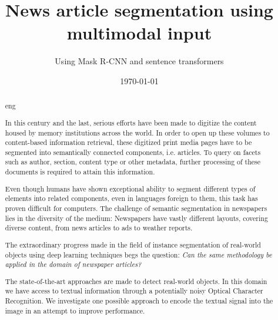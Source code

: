 \documentclass[english, bibtex]{kththesis}
\title{News article segmentation using multimodal input}
\subtitle{Using Mask R-CNN and sentence transformers}
\date{\today}
\begin{document}
%

\titlepage
\bookinfopage

\frontmatter
\setcounter{page}{1}
\begin{abstract}
  \markboth{\abstractname}{}
\begin{scontents}[store-env=lang]
eng
\end{scontents}
\begin{scontents}[store-env=abstracts,print-env=true]

In this century and the last, serious efforts have been made to digitize the content housed by memory institutions across the world. In order to open up these volumes to content-based information retrieval, these digitized print media pages have to be segmented into semantically connected components, i.e. articles. To query on facets such as author, section, content type or other metadata, further processing of these documents is required to attain this information.  

Even though humans have shown exceptional ability to segment different types of elements into related components, even in languages foreign to them, this task has proven difficult for computers. The challenge of semantic segmentation in newspapers lies in the diversity of the medium: Newspapers have vastly different layouts, covering diverse content, from news articles to ads to weather reports.

The extraordinary progress made in the field of instance segmentation of real-world objects using deep learning techniques begs the question: \textit{Can the same methodology be applied in the domain of newspaper articles?}

The state-of-the-art approaches are made to detect real-world objects. In this domain we have access to textual information through a potentially noisy Optical Character Recognition. We investigate one possible approach to encode the textual signal into the image in an attempt to improve performance. 


\end{scontents}
\end{abstract}
\end{document}
